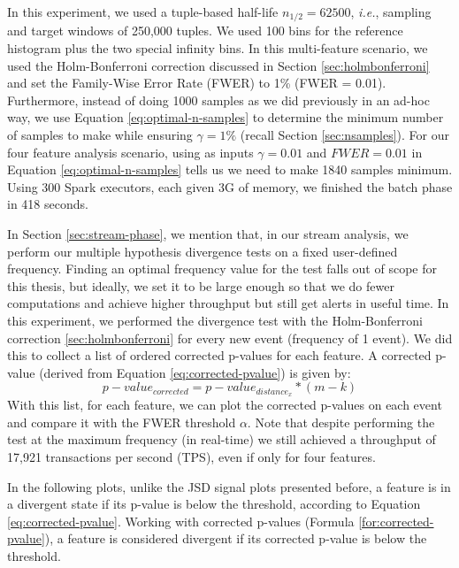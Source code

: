 In this experiment, we used a tuple-based half-life $n_{1/2}=62500$, \textit{i.e.}, sampling and target windows of 250,000 tuples. We used 100 bins for the reference histogram plus the two special infinity bins. In this multi-feature scenario, we used the Holm-Bonferroni correction discussed in Section \ref{sec:holmbonferroni} and set the Family-Wise Error Rate (FWER) to 1\% (FWER = 0.01). Furthermore, instead of doing 1000 samples as we did previously in an ad-hoc way, we use Equation \ref{eq:optimal-n-samples} to determine the minimum number of samples to make while ensuring $\gamma=1\%$ (recall Section \ref{sec:nsamples}). For our four feature analysis scenario, using as inputs  $\gamma=0.01$ and $FWER=0.01$ in Equation \ref{eq:optimal-n-samples} tells us we need to make 1840 samples minimum. Using 300 Spark executors, each given 3G of memory, we finished the batch phase in 418 seconds.

In Section \ref{sec:stream-phase}, we mention that, in our stream analysis, we perform our multiple hypothesis divergence tests on a fixed user-defined frequency. Finding an optimal frequency value for the test falls out of scope for this thesis, but ideally, we set it to be large enough so that we do fewer computations and achieve higher throughput but still get alerts in useful time. In this experiment, we performed the divergence test with the Holm-Bonferroni correction \ref{sec:holmbonferroni} for every new event (frequency of 1 event). We did this to collect a list of ordered corrected p-values for each feature. A corrected p-value (derived from Equation \ref{eq:corrected-pvalue}) is given by:
\begin{equation}
    p-value_{corrected} = p-value_{distance_{x}} * (m - k)
    \label{for:corrected-pvalue}
\end{equation}
With this list, for each feature, we can plot the corrected p-values on each event and compare it with the FWER threshold $\alpha$. Note that despite performing the test at the maximum frequency (in real-time) we still achieved a throughput of 17,921 transactions per second (TPS), even if only for four features.

In the following plots, unlike the JSD signal plots presented before, a feature is in a divergent state if its p-value is below the threshold, according to Equation \ref{eq:corrected-pvalue}. Working with corrected p-values (Formula \ref{for:corrected-pvalue}), a feature is considered divergent if its corrected p-value is below the threshold.

